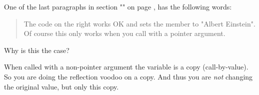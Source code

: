 \begin{Exercise}[title={Pointers and reflection},difficulty=5]
\label{ex:pointers and reflection}
\Question
One of the last paragraphs in section "" 
on page \pageref{sec:introspection and reflection}, has
the following words:
\begin{quote}
The code on the right works OK and sets the member 
to "Albert Einstein". Of course this only works when you call 
with a pointer argument.
\end{quote}
Why is this the case?
\end{Exercise}

\begin{Answer}
\Question
When called with a non-pointer argument the variable is a copy (call-by-value). So you
are doing the reflection voodoo on a copy. And thus you are \emph{not}
changing the original value, but only this copy.
\end{Answer}
